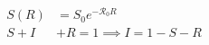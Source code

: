\begin{align*}
    S(R) &= S_0e^{-{\mathcal R_0}R}\\
    S + I& + R = 1 \implies I = 1 - S - R\\
\end{align*}

